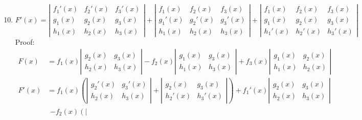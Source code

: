 \documentclass[a4paper, 12pt]{article}
\begin{document}
\begin{enumerate}
		\setcounter{enumi}{9}
		\item
		\[ F'(x) = \left| \begin{array}{ccc}
		f_1'(x) & f_2'(x) & f_3'(x) \\
		g_1(x) & g_2(x) & g_3(x) \\
		h_1(x) & h_2(x) & h_3(x)
		\end{array} \right|
		+ \left| \begin{array}{ccc}
		f_1(x) & f_2(x) & f_3(x) \\
		g_1'(x) & g_2'(x) & g_3'(x) \\
		h_1(x) & h_2(x) & h_3(x)
		\end{array} \right|
		+ \left| \begin{array}{ccc}
		f_1(x) & f_2(x) & f_3(x) \\
		g_1(x) & g_2(x) & g_3(x) \\
		h_1'(x) & h_2'(x) & h_3'(x)
		\end{array} \right| \]
		Proof:
		\begin{align*}
		F(x) &= f_1(x)\left| \begin{array}{cc}
		g_2(x) & g_3(x) \\
		h_2(x) & h_3(x)
		\end{array} \right|
		- f_2(x)\left| \begin{array}{cc}
		g_1(x) & g_3(x) \\
		h_1(x) & h_3(x)
		\end{array} \right|
		+ f_3(x)\left| \begin{array}{cc}
		g_1(x) & g_2(x) \\
		h_1(x) & h_2(x)
		\end{array} \right| \\
		F'(x) &= f_1(x)\left(\left| \begin{array}{cc}
		g_2'(x) & g_3'(x) \\
		h_2(x) & h_3(x)
		\end{array} \right|
		+ \left| \begin{array}{cc}
		g_2(x) & g_3(x) \\
		h_2'(x) & h_3'(x)
		\end{array} \right|\right)
		+ f_1'(x)\left| \begin{array}{cc}
		g_2(x) & g_3(x) \\
		h_2(x) & h_3(x)
		\end{array} \right| \\
		&
		\begin{aligned}
		- f_2(x)\left(\left| \begin{array}{cc}

\end{array}
\end{aligned}
\end{align*}
\end{enumerate}
\end{document}

